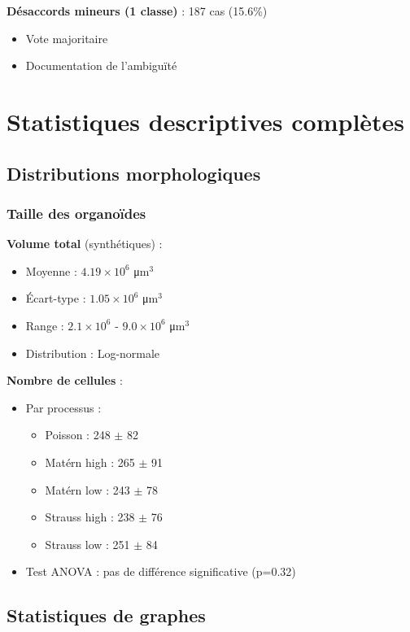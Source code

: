 \textbf{Désaccords mineurs (1 classe)} : 187 cas (15.6\%)
\begin{itemize}
    \item Vote majoritaire
    \item Documentation de l'ambiguïté
\end{itemize}

\section{Statistiques descriptives complètes}

\subsection{Distributions morphologiques}

\subsubsection{Taille des organoïdes}

\textbf{Volume total} (synthétiques) :
\begin{itemize}
    \item Moyenne : $4.19 \times 10^6$ μm$^3$
    \item Écart-type : $1.05 \times 10^6$ μm$^3$
    \item Range : $2.1 \times 10^6$ - $9.0 \times 10^6$ μm$^3$
    \item Distribution : Log-normale
\end{itemize}

\textbf{Nombre de cellules} :
\begin{itemize}
    \item Par processus :
        \begin{itemize}
            \item Poisson : 248 $\pm$ 82
            \item Matérn high : 265 $\pm$ 91
            \item Matérn low : 243 $\pm$ 78
            \item Strauss high : 238 $\pm$ 76
            \item Strauss low : 251 $\pm$ 84
        \end{itemize}
    \item Test ANOVA : pas de différence significative (p=0.32)
\end{itemize}

\subsection{Statistiques de graphes}

